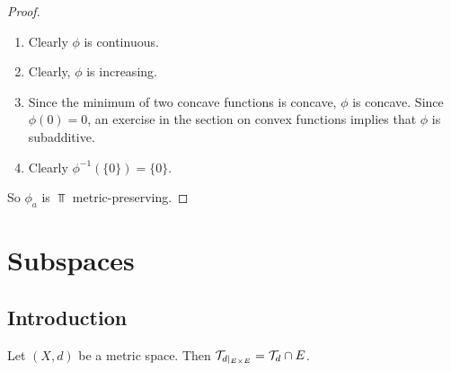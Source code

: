 \documentclass{book}
\begin{document}
\begin{proof}\
	\begin{enumerate}
		\item Clearly $\phi$ is continuous.
		\item Clearly, $\phi$ is increasing. 
		\item Since the minimum of two concave functions is concave, $\phi$ is concave. Since $\phi(0) = 0$, an exercise in the section on convex functions implies that $\phi$ is subadditive. 
		\item Clearly $\phi^{-1}(\{0\}) = \{0\}$.	
	\end{enumerate}	
	So $\phi_a$ is $\Top$ metric-preserving.
\end{proof}
















































\newpage
\section{Subspaces}

\subsection{Introduction}

\begin{ex} 
	Let $(X, d)$ be a metric space. Then $\mathcal{T}_{d|_{E \times E}} = \mathcal{T}_d \cap E$. 
\end{ex}
\end{document}
